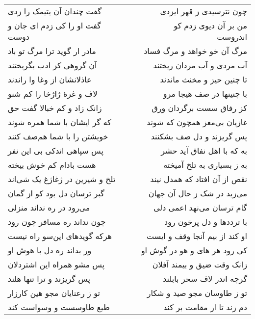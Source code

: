 \begin{center}
\begin{longtable}{l p{0.5cm} r}
گفت چندان آن یتیمک را زدی
&&
چون نترسیدی ز قهر ایزدی
\\
گفت او را کی زدم ای جان و دوست
&&
من بر آن دیوی زدم کو اندروست
\\
مادر ار گوید ترا مرگ تو باد
&&
مرگ آن خو خواهد و مرگ فساد
\\
آن گروهی کز ادب بگریختند
&&
آب مردی و آب مردان ریختند
\\
عاذلانشان از وغا وا راندند
&&
تا چنین حیز و مخنث ماندند
\\
لاف و غرهٔ ژاژخا را کم شنو
&&
با چنینها در صف هیجا مرو
\\
زانک زاد و کم خبالا گفت حق
&&
کز رفاق سست برگردان ورق
\\
که گر ایشان با شما همره شوند
&&
غازیان بی‌مغز همچون که شوند
\\
خویشتن را با شما هم‌صف کنند
&&
پس گریزند و دل صف بشکنند
\\
پس سپاهی اندکی بی این نفر
&&
به که با اهل نفاق آید حشر
\\
هست بادام کم خوش بیخته
&&
به ز بسیاری به تلخ آمیخته
\\
تلخ و شیرین در ژغاژغ یک شی‌اند
&&
نقص از آن افتاد که همدل نیند
\\
گبر ترسان دل بود کو از گمان
&&
می‌زید در شک ز حال آن جهان
\\
می‌رود در ره نداند منزلی
&&
گام ترسان می‌نهد اعمی دلی
\\
چون نداند ره مسافر چون رود
&&
با ترددها و دل پرخون رود
\\
هرکه گویدهای این‌سو راه نیست
&&
او کند از بیم آنجا وقف و ایست
\\
ور بداند ره دل با هوش او
&&
کی رود هر های و هو در گوش او
\\
پس مشو همراه این اشتردلان
&&
زانک وقت ضیق و بیمند آفلان
\\
پس گریزند و ترا تنها هلند
&&
گرچه اندر لاف سحر بابلند
\\
تو ز رعنایان مجو هین کارزار
&&
تو ز طاوسان مجو صید و شکار
\\
طبع طاوسست و وسواست کند
&&
دم زند تا از مقامت بر کند
\\
\end{longtable}
\end{center}
